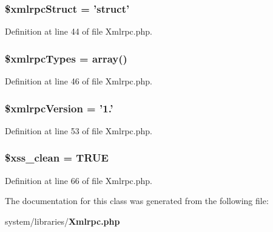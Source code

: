 \subsubsection[{\$xmlrpc\-Struct}]{\setlength{\rightskip}{0pt plus 5cm}\$xmlrpc\-Struct = 'struct'}\label{class_c_i___xmlrpc_a9a499285050ed5c867eec71854231f01}


Definition at line 44 of file Xmlrpc.\-php.

\subsubsection[{\$xmlrpc\-Types}]{\setlength{\rightskip}{0pt plus 5cm}\$xmlrpc\-Types = array()}\label{class_c_i___xmlrpc_a2b937e1ca5ee8495f0251a74222cec64}


Definition at line 46 of file Xmlrpc.\-php.

\subsubsection[{\$xmlrpc\-Version}]{\setlength{\rightskip}{0pt plus 5cm}\$xmlrpc\-Version = '1.'}\label{class_c_i___xmlrpc_a4130f55bb1f23dcabf9cf3ae5f5a746d}


Definition at line 53 of file Xmlrpc.\-php.

\subsubsection[{\$xss\-\_\-clean}]{\setlength{\rightskip}{0pt plus 5cm}\$xss\-\_\-clean = T\-R\-U\-E}\label{class_c_i___xmlrpc_a0f2ee8861c0b3164a5c6e126dd98c0cc}


Definition at line 66 of file Xmlrpc.\-php.



The documentation for this class was generated from the following file\-:\begin{DoxyCompactItemize}
\item 
system/libraries/{\bf Xmlrpc.\-php}\end{DoxyCompactItemize}
